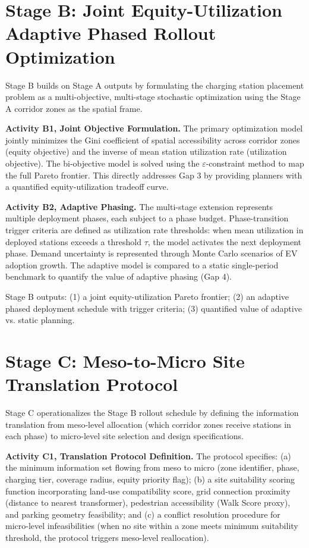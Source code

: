 \documentclass[letterpaper, 12pt, oneside, doublespacing]{Thesis}
\begin{document}
\section{Stage B: Joint Equity-Utilization Adaptive Phased Rollout Optimization}

Stage B builds on Stage A outputs by formulating the charging station placement problem as a multi-objective, multi-stage stochastic optimization using the Stage A corridor zones as the spatial frame.


\noindent \textbf{Activity B1, Joint Objective Formulation.} The primary optimization model jointly minimizes the Gini coefficient of spatial accessibility across corridor zones (equity objective) and the inverse of mean station utilization rate (utilization objective). The bi-objective model is solved using the $\varepsilon$-constraint method to map the full Pareto frontier. This directly addresses Gap 3 by providing planners with a quantified equity-utilization tradeoff curve.



\noindent \textbf{Activity B2, Adaptive Phasing.} The multi-stage extension represents multiple deployment phases, each subject to a phase budget. Phase-transition trigger criteria are defined as utilization rate thresholds: when mean utilization in deployed stations exceeds a threshold $\tau$, the model activates the next deployment phase. Demand uncertainty is represented through Monte Carlo scenarios of EV adoption growth. The adaptive model is compared to a static single-period benchmark to quantify the value of adaptive phasing (Gap 4).


Stage B outputs: (1) a joint equity-utilization Pareto frontier; (2) an adaptive phased deployment schedule with trigger criteria; (3) quantified value of adaptive vs. static planning.

\section{Stage C: Meso-to-Micro Site Translation Protocol}

Stage C operationalizes the Stage B rollout schedule by defining the information translation from meso-level allocation (which corridor zones receive stations in each phase) to micro-level site selection and design specifications.


\noindent \textbf{Activity C1, Translation Protocol Definition.} The protocol specifies: (a) the minimum information set flowing from meso to micro (zone identifier, phase, charging tier, coverage radius, equity priority flag); (b) a site suitability scoring function incorporating land-use compatibility score, grid connection proximity (distance to nearest transformer), pedestrian accessibility (Walk Score proxy), and parking geometry feasibility; and (c) a conflict resolution procedure for micro-level infeasibilities (when no site within a zone meets minimum suitability threshold, the protocol triggers meso-level reallocation).
\end{document}
